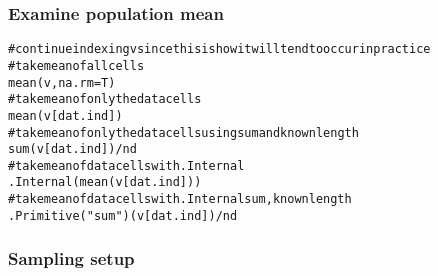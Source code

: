\documentclass{article}\usepackage[]{graphicx}\usepackage[]{color}
\makeatletter
\newcommand{\hlstr}[1]{\textcolor[rgb]{0.863,0.196,0.184}{#1}}%
\newcommand{\hlcom}[1]{\textcolor[rgb]{0.345,0.431,0.459}{#1}}%
\newcommand{\hlopt}[1]{\textcolor[rgb]{0.576,0.631,0.631}{#1}}%
\newcommand{\hlstd}[1]{\textcolor[rgb]{0.514,0.58,0.588}{#1}}%
\newcommand{\hlkwc}[1]{\textcolor[rgb]{0.796,0.294,0.086}{#1}}%
\newcommand{\hlkwd}[1]{\textcolor[rgb]{0.576,0.631,0.631}{#1}}%
\newenvironment{kframe}{%
 \def\at@end@of@kframe{}%
 \ifinner\ifhmode%
  \def\at@end@of@kframe{\end{minipage}}%
  \begin{minipage}{\columnwidth}%
 \fi\fi%
 \def\FrameCommand##1{\hskip\@totalleftmargin \hskip-\fboxsep
 \colorbox{shadecolor}{##1}\hskip-\fboxsep
     \hskip-\linewidth \hskip-\@totalleftmargin \hskip\columnwidth}%
 \MakeFramed {\advance\hsize-\width
   \@totalleftmargin\z@ \linewidth\hsize
   \@setminipage}}%
 {\par\unskip\endMakeFramed%
 \at@end@of@kframe}
\newenvironment{knitrout}{}{} %
\makeatother
\begin{document}
\subsubsection{Examine population mean}

\begin{knitrout}
\color{fgcolor}\begin{kframe}
\begin{alltt}
\hlcom{# continue indexing v since this is how it will tend to occur in practice}
\hlcom{# take mean of all cells}
\hlkwd{mean}\hlstd{(v,} \hlkwc{na.rm} \hlstd{= T)}
\hlcom{# take mean of only the data cells}
\hlkwd{mean}\hlstd{(v[dat.ind])}
\hlcom{# take mean of only the data cells using sum and known length}
\hlkwd{sum}\hlstd{(v[dat.ind])}\hlopt{/}\hlstd{nd}
\hlcom{# take mean of data cells with .Internal}
\hlkwd{.Internal}\hlstd{(}\hlkwd{mean}\hlstd{(v[dat.ind]))}
\hlcom{# take mean of data cells with .Internal sum, known length}
\hlkwd{.Primitive}\hlstd{(}\hlstr{"sum"}\hlstd{)(v[dat.ind])}\hlopt{/}\hlstd{nd}
\end{alltt}
\end{kframe}
\end{knitrout}

\subsubsection{Sampling setup}
\end{document}
